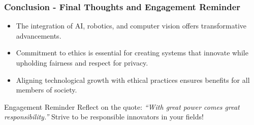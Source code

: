 \documentclass[aspectratio=169]{beamer}
\begin{document}
\begin{frame}[fragile]
    \frametitle{Conclusion - Final Thoughts and Engagement Reminder}

    \begin{itemize}
        \item The integration of AI, robotics, and computer vision offers transformative advancements.
        \item Commitment to ethics is essential for creating systems that innovate while upholding fairness and respect for privacy.
        \item Aligning technological growth with ethical practices ensures benefits for all members of society.
    \end{itemize}

    \vspace{1em}
    \begin{block}{Engagement Reminder}
        Reflect on the quote: \textit{``With great power comes great responsibility.''}
        Strive to be responsible innovators in your fields!
    \end{block}
\end{frame}
\end{document}
